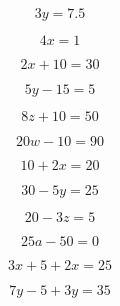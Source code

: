 \documentclass[11pt]{article}
\begin{document}
\newpage

\begin{multicols}{2}

\begin{equation}
3y = 7.5
\end{equation}

\vspace{1cm}

\begin{equation}
4x = 1
\end{equation}

\vspace{1cm}

\begin{equation}
2x + 10 = 30
\end{equation}

\vspace{1cm}

\begin{equation}
5y - 15 = 5
\end{equation}

\vspace{1cm}

\begin{equation}
8z + 10 = 50
\end{equation}

\vspace{1cm}

\begin{equation}
20w - 10 = 90
\end{equation}

\vspace{1cm}

\begin{equation}
10 + 2x = 20
\end{equation}

\vspace{1cm}

\begin{equation}
30 - 5y = 25
\end{equation}

\vspace{1cm}

\begin{equation}
20 - 3z = 5
\end{equation}

\vspace{1cm}

\begin{equation}
25a - 50 = 0
\end{equation}

\vspace{1cm}

\begin{equation}
3x + 5 + 2x = 25
\end{equation}

\vspace{1cm}

\begin{equation}
7y - 5 + 3y = 35
\end{equation}

\vspace{1cm}



\end{multicols}

    
\end{document}
